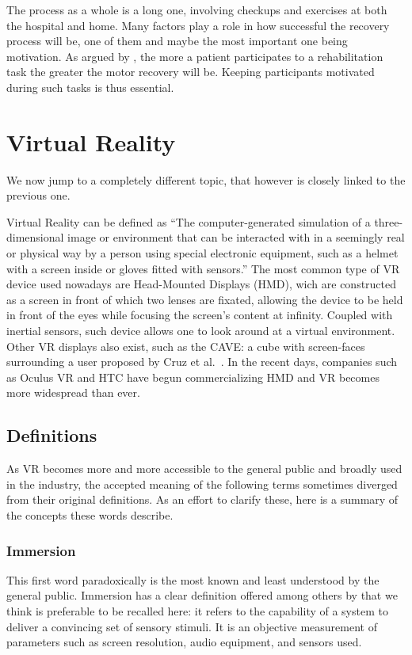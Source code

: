 The process as a whole is a long one, involving checkups and exercises at both the hospital and home. Many factors play a role in how successful the recovery process will be, one of them and maybe the most important one being motivation. As argued by \cite{flores2008improving}, the more a patient participates to a rehabilitation task the greater the motor recovery will be. Keeping participants motivated during such tasks is thus essential.

\section{Virtual Reality}

We now jump to a completely different topic, that however is closely linked to the previous one.

Virtual Reality can be defined as ``The computer-generated simulation of a three-dimensional image or environment that can be interacted with in a seemingly real or physical way by a person using special electronic equipment, such as a helmet with a screen inside or gloves fitted with sensors.'' \cite{oxford2015} The most common type of VR device used nowadays are Head-Mounted Displays (HMD), wich are constructed as a screen in front of which two lenses are fixated, allowing the device to be held in front of the eyes while focusing the screen's content at infinity. Coupled with inertial sensors, such device allows one to look around at a virtual environment. Other VR displays also exist, such as the CAVE: a cube with screen-faces surrounding a user proposed by Cruz et al.\ \cite{cruz1992cave}. In the recent days, companies such as Oculus VR and HTC have begun commercializing HMD and VR becomes more widespread than ever.

\subsection{Definitions}
As VR becomes more and more accessible to the general public and broadly used in the industry, the accepted meaning of the following terms sometimes diverged from their original definitions. As an effort to clarify these, here is a summary of the concepts these words describe.

\subsubsection{Immersion}
This first word paradoxically is the most known and least understood by the general public. Immersion has a clear definition offered among others by \cite{slater2003note,sanchez2005presence} that we think is preferable to be recalled here: it refers to the capability of a system to deliver a convincing set of sensory stimuli. It is an objective measurement of parameters such as screen resolution, audio equipment, and sensors used.

